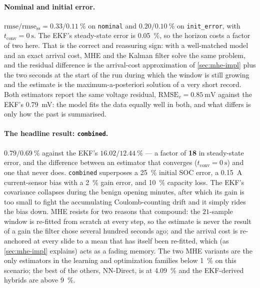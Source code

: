 \paragraph{Nominal and initial error.}  $\mathrm{rmse}/\mathrm{rmse_{ss}} =
0.33/\SI{0.11}{\percent}$ on \texttt{nominal} and $0.20/\SI{0.10}{\percent}$ on
\texttt{init\_error}, with $t_\text{conv} = \SI{0}{\second}$.  The EKF's steady-state error is
\SI{0.05}{\percent}, so the horizon costs a factor of two here.  That is the correct and
reassuring sign: with a well-matched model and an exact arrival cost, MHE and the Kalman filter
solve the same problem, and the residual difference is the arrival-cost approximation of
\cref{sec:mhe-impl} plus the two seconds at the start of the run during which the window is still
growing and the estimate is the maximum-a-posteriori solution of a very short record.  Both
estimators report the same voltage residual, $\mathrm{RMSE}_v = \SI{0.85}{\milli\volt}$ against the
EKF's \SI{0.79}{\milli\volt}: the model fits the data equally well in both, and what differs is
only how the past is summarised.

\paragraph{The headline result: \texttt{combined}.}  $0.79/\SI{0.69}{\percent}$ against the EKF's
$16.02/\SI{12.44}{\percent}$ --- a factor of \textbf{18} in steady-state error, and the difference
between an estimator that converges ($t_\text{conv} = \SI{0}{\second}$) and one that never does.
\texttt{combined} superposes a \SI{25}{\percent} initial SOC error, a \SI{0.15}{\ampere}
current-sensor bias with a \SI{2}{\percent} gain error, and \SI{10}{\percent} capacity loss.  The
EKF's covariance collapses during the benign opening minutes, after which its gain is too small to
fight the accumulating Coulomb-counting drift and it simply rides the bias down.  MHE resists for
two reasons that compound: the $21$-sample window is re-fitted from scratch at every step, so the
estimate is never the result of a gain the filter chose several hundred seconds ago; and the
arrival cost is re-anchored at every slide to a mean that has itself been re-fitted, which (as
\cref{sec:mhe-impl} explains) acts as a fading memory.  The two MHE variants are the only
estimators in the learning and optimization families below \SI{1}{\percent} on this scenario; the
best of the others, NN-Direct, is at \SI{4.09}{\percent} and the EKF-derived hybrids are above
\SI{9}{\percent}.

